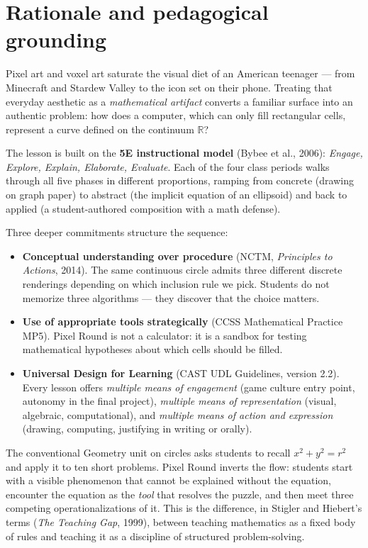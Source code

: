 \documentclass[12pt,letterpaper]{scrartcl}
\newcommand{\acc}[1]{\textcolor{accent}{\textbf{#1}}}
\begin{document}
\section{Rationale and pedagogical grounding}

Pixel art and voxel art saturate the visual diet of an American teenager --- from Minecraft and Stardew Valley to the icon set on their phone. Treating that everyday aesthetic as a \emph{mathematical artifact} converts a familiar surface into an authentic problem: how does a computer, which can only fill rectangular cells, represent a curve defined on the continuum $\mathbb{R}$?

The lesson is built on the \acc{5E instructional model} (Bybee et al., 2006): \emph{Engage, Explore, Explain, Elaborate, Evaluate}. Each of the four class periods walks through all five phases in different proportions, ramping from concrete (drawing on graph paper) to abstract (the implicit equation of an ellipsoid) and back to applied (a student-authored composition with a math defense).

Three deeper commitments structure the sequence:

\begin{itemize}[leftmargin=1.3em,itemsep=0.15em,topsep=0.3em]
  \item \acc{Conceptual understanding over procedure} (NCTM, \emph{Principles to Actions}, 2014). The same continuous circle admits three different discrete renderings depending on which inclusion rule we pick. Students do not memorize three algorithms --- they discover that the choice matters.
  \item \acc{Use of appropriate tools strategically} (CCSS Mathematical Practice MP5). Pixel Round is not a calculator: it is a sandbox for testing mathematical hypotheses about which cells should be filled.
  \item \acc{Universal Design for Learning} (CAST UDL Guidelines, version 2.2). Every lesson offers \emph{multiple means of engagement} (game culture entry point, autonomy in the final project), \emph{multiple means of representation} (visual, algebraic, computational), and \emph{multiple means of action and expression} (drawing, computing, justifying in writing or orally).
\end{itemize}

\begin{note}
The conventional Geometry unit on circles asks students to recall $x^2 + y^2 = r^2$ and apply it to ten short problems. Pixel Round inverts the flow: students start with a visible phenomenon that cannot be explained without the equation, encounter the equation as the \emph{tool} that resolves the puzzle, and then meet three competing operationalizations of it. This is the difference, in Stigler and Hiebert's terms (\emph{The Teaching Gap}, 1999), between teaching mathematics as a fixed body of rules and teaching it as a discipline of structured problem-solving.
\end{note}
\end{document}
